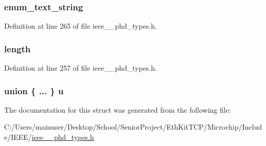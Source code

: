 \subsubsection[{enum\+\_\+text\+\_\+string}]{ enum\+\_\+text\+\_\+string}\label{struct___enum_val_acdf1fca8a0a0e3269df2cba7026aa241}


Definition at line 265 of file ieee\+\_\+\_\+phd\+\_\+types.\+h.

\hypertarget{struct___enum_val_a3743679e4ff85e3e1b3fc2e59973fbb3}{}
\subsubsection[{length}]{ length}\label{struct___enum_val_a3743679e4ff85e3e1b3fc2e59973fbb3}


Definition at line 257 of file ieee\+\_\+\_\+phd\+\_\+types.\+h.

\hypertarget{struct___enum_val_ab1914d275d8e14bfe2acfdfed8a3f339}{}
\subsubsection[{u}]{\setlength{\rightskip}{0pt plus 5cm}union \{ ... \}   u}\label{struct___enum_val_ab1914d275d8e14bfe2acfdfed8a3f339}


The documentation for this struct was generated from the following file\+:\begin{DoxyCompactItemize}
\item 
C\+:/\+Users/mainuser/\+Desktop/\+School/\+Senior\+Project/\+Eth\+Kit\+T\+C\+P/\+Microchip/\+Include/\+I\+E\+E\+E/\hyperlink{ieee__11073__phd__types_8h}{ieee\+\_\+\_\+phd\+\_\+types.\+h}\end{DoxyCompactItemize}
